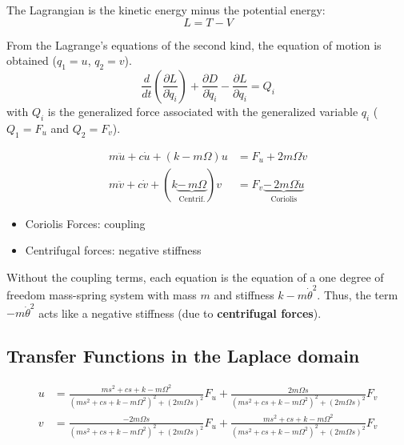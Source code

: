 \documentclass{ISMA_USD2020}
\begin{document}
The Lagrangian is the kinetic energy minus the potential energy:
\begin{equation}
L = T - V
\end{equation}

From the Lagrange's equations of the second kind, the equation of motion is obtained (\(q_1 = u\), \(q_2 = v\)).
\begin{equation}
  \frac{d}{dt} \left( \frac{\partial L}{\partial \dot{q}_i} \right) + \frac{\partial D}{\partial \dot{q}_i} - \frac{\partial L}{\partial q_i} = Q_i
\end{equation}
with \(Q_i\) is the generalized force associated with the generalized variable \(q_i\) (\(Q_1 = F_u\) and \(Q_2 = F_v\)).


\begin{subequations}
  \begin{align}
    m \ddot{u} + c \dot{u} + ( k - m \Omega ) u &= F_u + 2 m \Omega \dot{v} \\
    m \ddot{v} + c \dot{v} + ( k \underbrace{-\,m \Omega}_{\text{Centrif.}} ) v &= F_v \underbrace{-\,2 m \Omega \dot{u}}_{\text{Coriolis}}
  \end{align}
\end{subequations}

\begin{itemize}
\item Coriolis Forces: coupling
\item Centrifugal forces: negative stiffness
\end{itemize}

Without the coupling terms, each equation is the equation of a one degree of freedom mass-spring system with mass \(m\) and stiffness \(k- m\dot{\theta}^2\).
Thus, the term \(- m\dot{\theta}^2\) acts like a negative stiffness (due to \textbf{centrifugal forces}).


\subsection{Transfer Functions in the Laplace domain}
\label{sec:org1590670}

\begin{subequations}
  \begin{align}
    u &= \frac{ms^2 + cs + k - m \Omega^2}{\left( m s^2 + cs + k - m \Omega^2 \right)^2 + \left( 2 m \Omega s \right)^2} F_u +  \frac{2 m \Omega s}{\left( m s^2 + cs + k - m \Omega^2 \right)^2 + \left( 2 m \Omega s \right)^2} F_v \\
    v &= \frac{-2 m \Omega s}{\left( m s^2 + cs + k - m \Omega^2 \right)^2 + \left( 2 m \Omega s \right)^2} F_u +  \frac{ms^2 + cs + k - m \Omega^2}{\left( m s^2 + cs + k - m \Omega^2 \right)^2 + \left( 2 m \Omega s \right)^2} F_v
  \end{align}
\end{subequations}
\end{document}
